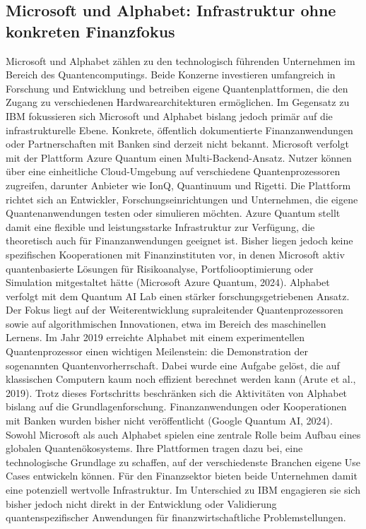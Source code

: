 \subsection{Microsoft und Alphabet: Infrastruktur ohne konkreten Finanzfokus}

Microsoft und Alphabet zählen zu den technologisch führenden Unternehmen im Bereich des Quantencomputings. Beide Konzerne investieren umfangreich in Forschung und Entwicklung und betreiben eigene Quantenplattformen, die den Zugang zu verschiedenen Hardwarearchitekturen ermöglichen. Im Gegensatz zu IBM fokussieren sich Microsoft und Alphabet bislang jedoch primär auf die infrastrukturelle Ebene. Konkrete, öffentlich dokumentierte Finanzanwendungen oder Partnerschaften mit Banken sind derzeit nicht bekannt.
Microsoft verfolgt mit der Plattform Azure Quantum einen Multi-Backend-Ansatz. Nutzer können über eine einheitliche Cloud-Umgebung auf verschiedene Quantenprozessoren zugreifen, darunter Anbieter wie IonQ, Quantinuum und Rigetti. Die Plattform richtet sich an Entwickler, Forschungseinrichtungen und Unternehmen, die eigene Quantenanwendungen testen oder simulieren möchten. Azure Quantum stellt damit eine flexible und leistungsstarke Infrastruktur zur Verfügung, die theoretisch auch für Finanzanwendungen geeignet ist. Bisher liegen jedoch keine spezifischen Kooperationen mit Finanzinstituten vor, in denen Microsoft aktiv quantenbasierte Lösungen für Risikoanalyse, Portfoliooptimierung oder Simulation mitgestaltet hätte (Microsoft Azure Quantum, 2024).
Alphabet verfolgt mit dem Quantum AI Lab einen stärker forschungsgetriebenen Ansatz. Der Fokus liegt auf der Weiterentwicklung supraleitender Quantenprozessoren sowie auf algorithmischen Innovationen, etwa im Bereich des maschinellen Lernens. Im Jahr 2019 erreichte Alphabet mit einem experimentellen Quantenprozessor einen wichtigen Meilenstein: die Demonstration der sogenannten Quantenvorherrschaft. Dabei wurde eine Aufgabe gelöst, die auf klassischen Computern kaum noch effizient berechnet werden kann (Arute et al., 2019). Trotz dieses Fortschritts beschränken sich die Aktivitäten von Alphabet bislang auf die Grundlagenforschung. Finanzanwendungen oder Kooperationen mit Banken wurden bisher nicht veröffentlicht (Google Quantum AI, 2024).
Sowohl Microsoft als auch Alphabet spielen eine zentrale Rolle beim Aufbau eines globalen Quantenökosystems. Ihre Plattformen tragen dazu bei, eine technologische Grundlage zu schaffen, auf der verschiedenste Branchen eigene Use Cases entwickeln können. Für den Finanzsektor bieten beide Unternehmen damit eine potenziell wertvolle Infrastruktur. Im Unterschied zu IBM engagieren sie sich bisher jedoch nicht direkt in der Entwicklung oder Validierung quantenspezifischer Anwendungen für finanzwirtschaftliche Problemstellungen.

